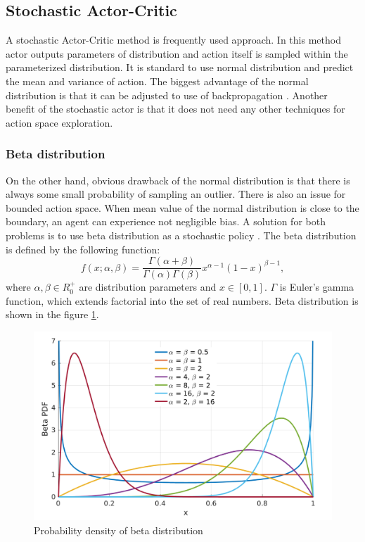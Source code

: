\subsection{Stochastic Actor-Critic}
A stochastic Actor-Critic method is frequently used approach. In this method actor outputs parameters of distribution and action itself is sampled within the parameterized distribution. It is standard to use normal distribution and predict the mean and variance of action. The biggest advantage of the normal distribution is that it can be adjusted to use of backpropagation \cite{hess2015}. Another benefit of the stochastic actor is that it does not need any other techniques for action space exploration.

\subsubsection{Beta distribution}
On the other hand, obvious drawback of the normal distribution is that there is always some small probability of sampling an outlier. There is also an issue for bounded action space. When mean value of the normal distribution is close to the boundary, an agent can experience not negligible bias. A solution for both problems is to use beta distribution as a stochastic policy \cite{chou17}. The beta distribution is defined by the following function:
\begin{equation}
f(x;\alpha, \beta) = \frac{\Gamma(\alpha + \beta)}{\Gamma(\alpha)\Gamma(\beta)}x^{\alpha-1}(1-x)^{\beta-1},
\end{equation}
where $\alpha,\beta \in R^+_0$ are distribution parameters and $x \in [0, 1]$. $\Gamma$ is Euler's gamma function, which extends factorial into the set of real numbers. Beta distribution is shown in the figure \ref{fig:beta}.

\begin{figure}[H]
\centering
\includegraphics[scale=0.2]{fig/beta.png}
\caption{Probability density of beta distribution}
\label{fig:beta}
\end{figure}

